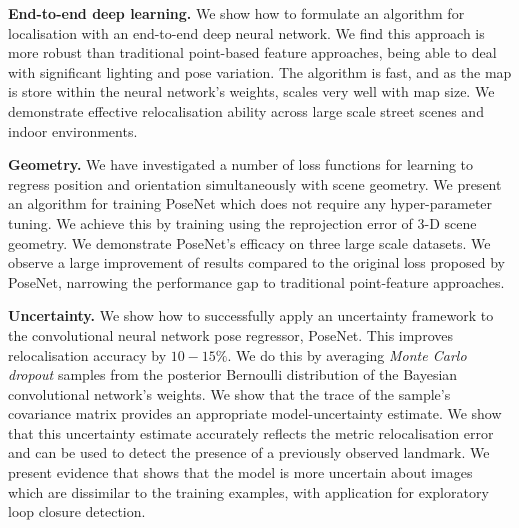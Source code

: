 \textbf{End-to-end deep learning.}
We show how to formulate an algorithm for localisation with an end-to-end deep neural network. We find this approach is more robust than traditional point-based feature approaches, being able to deal with significant lighting and pose variation. The algorithm is fast, and as the map is store within the neural network's weights, scales very well with map size. We demonstrate effective relocalisation ability across large scale street scenes and indoor environments.

\textbf{Geometry.}
We have investigated a number of loss functions for learning to regress position and orientation simultaneously with scene geometry. We present an algorithm for training PoseNet which does not require any hyper-parameter tuning. We achieve this by training using the reprojection error of 3-D scene geometry. We demonstrate PoseNet's efficacy on three large scale datasets. We observe a large improvement of results compared to the original loss proposed by PoseNet, narrowing the performance gap to traditional point-feature approaches. 

\textbf{Uncertainty.}
We show how to successfully apply an uncertainty framework to the convolutional neural network pose regressor, PoseNet. This improves relocalisation accuracy by $10 - 15\%$. We do this by averaging \textit{Monte Carlo dropout} samples from the posterior Bernoulli distribution of the Bayesian convolutional network's weights. We show that the trace of the sample's covariance matrix provides an appropriate model-uncertainty estimate. We show that this uncertainty estimate accurately reflects the metric relocalisation error and can be used to detect the presence of a previously observed landmark. We present evidence that shows that the model is more uncertain about images which are dissimilar to the training examples, with application for exploratory loop closure detection.

